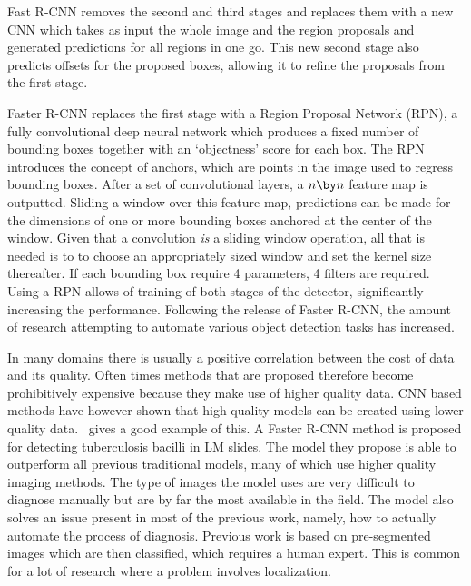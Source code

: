 Fast R-CNN removes the second and third stages and replaces them with a new CNN which takes as input the whole image and the region proposals and generated predictions for all regions in one go.
This new second stage also predicts offsets for the proposed boxes, allowing it to refine the proposals from the first stage.

Faster R-CNN replaces the first stage with a Region Proposal Network (RPN), a fully convolutional deep neural network which produces a fixed number of bounding boxes together with an `objectness' score for each box.
The RPN introduces the concept of anchors, which are points in the image used to regress bounding boxes.
After a set of convolutional layers, a \(n\by n\) feature map is outputted.
Sliding a window over this feature map, predictions can be made for the dimensions of one or more bounding boxes anchored at the center of the window.
Given that a convolution \textit{is} a sliding window operation, all that is needed is to to choose an appropriately sized window and set the kernel size thereafter.
If each bounding box require 4 parameters, 4 filters are required. 
Using a RPN allows of training of both stages of the detector, significantly increasing the performance.
Following the release of Faster R-CNN, the amount of research attempting to automate various object detection tasks has increased. 

In many domains there is usually a positive correlation between the cost of data and its quality.
Often times methods that are proposed therefore become prohibitively expensive because they make use of higher quality data.
CNN based methods have however shown that high quality models can be created using lower quality data.~\cite{el_melegy_automatic_2019} gives a good example of this.
A Faster R-CNN method is proposed for detecting tuberculosis bacilli in LM slides.
The model they propose is able to outperform all previous traditional models, many of which use higher quality imaging methods.
The type of images the model uses are very difficult to diagnose manually but are by far the most available in the field.
The model also solves an issue present in most of the previous work, namely, how to actually automate the process of diagnosis.
Previous work is based on pre-segmented images which are then classified, which requires a human expert.
This is common for a lot of research where a problem involves localization. 

